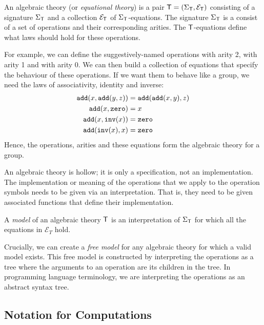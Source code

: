 
\begin{definition}
    An algebraic theory (or \emph{equational theory}) is a pair $\mathsf{T} = (\Sigma_\mathsf{T}, \mathcal{E}_\mathsf{T})$ consisting of a signature $\Sigma_\mathsf{T}$ and a collection $\mathcal{E}_\mathsf{T}$ of $\Sigma_\mathsf{T}$-equations. The signature $\Sigma_\mathsf{T}$ is a consist of a set of operations and their corresponding arities. The $\mathsf{T}$-equations define what laws should hold for these operations.
\end{definition}

For example, we can define the suggestively-named operations  with arity 2,  with arity 1 and  with arity 0. We can then build a collection of equations that specify the behaviour of these operations. If we want them to behave like a group, we need the laws of associativity, identity and inverse:
\begin{align*}
    \mathtt{add}(x, \mathtt{add}(y, z)) &= \mathtt{add}(\mathtt{add}(x, y), z) \\
    \mathtt{add}(x, \mathtt{zero}) &= x \\
    \mathtt{add}(x, \mathtt{inv}(x)) &= \mathtt{zero} \\
    \mathtt{add}(\mathtt{inv}(x), x) &= \mathtt{zero}
\end{align*}
Hence, the operations, arities and these equations form the algebraic theory for a group.

An algebraic theory is hollow; it is only a specification, not an implementation. The implementation or meaning of the operations that we apply to the operation symbols needs to be given via an interpretation. That is, they need to be given associated functions that define their implementation.

\begin{definition}[Model]
    A \emph{model} of an algebraic theory $\mathsf{T}$ is an interpretation of $\Sigma_\mathsf{T}$ for which all the equations in $\mathcal{E}_T$ hold.
\end{definition}

Crucially, we can create a \emph{free model} for any algebraic theory for which a valid model exists. This free model is constructed by interpreting the operations as a tree where the arguments to an operation are its children in the tree. In programming language terminology, we are interpreting the operations as an abstract syntax tree.

\subsection{Notation for Computations}

